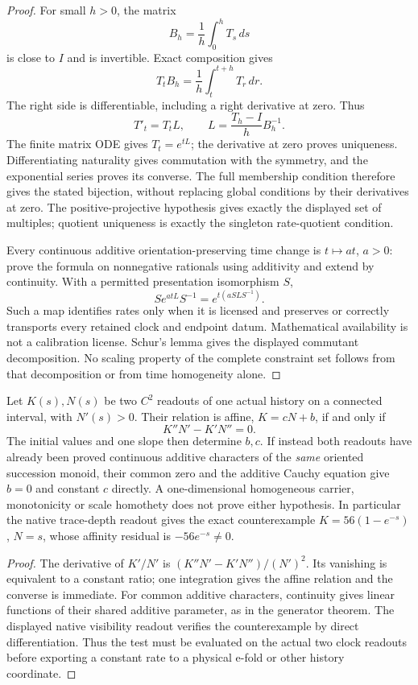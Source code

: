 \documentclass[12pt,a4paper]{article}
\begin{document}
\begin{proof}
For small \(h>0\), the matrix
\[
 B_h=\frac1h\int_0^hT_s\,ds
\]
is close to \(I\) and is invertible. Exact composition gives
\[
 T_tB_h=\frac1h\int_t^{t+h}T_r\,dr.
\]
The right side is differentiable, including a right derivative at zero.
Thus
\[
 T'_t=T_tL,\qquad L=\frac{T_h-I}{h}B_h^{-1}.
\]
The finite matrix ODE gives \(T_t=e^{tL}\); the derivative at zero proves
uniqueness. Differentiating naturality gives commutation with the symmetry,
and the exponential series proves its converse. The full membership
condition therefore gives the stated bijection, without replacing global
conditions by their derivatives at zero. The positive-projective hypothesis
gives exactly the displayed set of multiples; quotient uniqueness is exactly
the singleton rate-quotient condition.

Every continuous additive orientation-preserving time change is
\(t\mapsto at\), \(a>0\): prove the formula on nonnegative rationals
using additivity and extend by continuity. With a permitted presentation
isomorphism \(S\),
\[
 S e^{atL}S^{-1}=e^{t(aSLS^{-1})}.
\]
Such a map identifies rates only when it is licensed and preserves or
correctly transports every retained clock and endpoint datum. Mathematical
availability is not a calibration license. Schur's lemma gives the displayed
commutant decomposition. No scaling property of the complete constraint set
follows from that decomposition or from time homogeneity alone.
\end{proof}

\begin{proposition}
\label{p3a:prop:v2211-clock-affinity-certificate}
Let $K(s),N(s)$ be two $C^2$ readouts of one actual history on a connected
interval, with $N'(s)>0$. Their relation is affine, $K=cN+b$, if and only if
\[
 \boxed{K''N'-K'N''=0.}
\]
The initial values and one slope then determine $b,c$. If instead both
readouts have already been proved continuous additive characters of the
\emph{same} oriented succession monoid, their common zero and the additive
Cauchy equation give $b=0$ and constant $c$ directly. A one-dimensional
homogeneous carrier, monotonicity or scale homothety does not prove either
hypothesis. In particular the native trace-depth readout gives the exact
counterexample $K=56(1-e^{-s})$, $N=s$, whose affinity residual is
$-56e^{-s}\ne0$.
\end{proposition}
\begin{proof}
The derivative of $K'/N'$ is
$(K''N'-K'N'')/(N')^2$. Its vanishing is equivalent to a constant ratio;
one integration gives the affine relation and the converse is immediate.
For common additive characters, continuity gives linear functions of their
shared additive parameter, as in the generator theorem. The displayed native
visibility readout verifies the counterexample by direct differentiation.
Thus the test must be evaluated on the actual two clock readouts before
exporting a constant rate to a physical e-fold or other history coordinate.
\end{proof}
\end{document}
